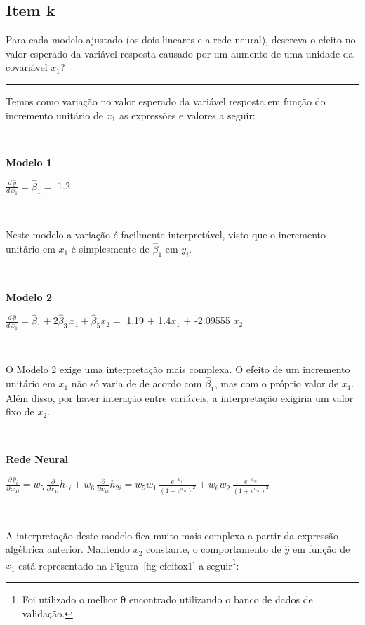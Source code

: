 \documentclass[
  a4paperpaper,
]{article}
\begin{document}
\subsection{Item k}\label{item-k}

Para cada modelo ajustado (os dois lineares e a rede neural), descreva o
efeito no valor esperado da variável resposta causado por um aumento de
uma unidade da covariável \(x_1\)?

\begin{center}\rule{0.5\linewidth}{0.5pt}\end{center}

Temos como variação no valor esperado da variável resposta em função do
incremento unitário de \(x_1\) as expressões e valores a seguir:

~

\textbf{Modelo 1}

\(\frac{d \, \hat{y}}{d \, x_1} = \hat{\beta}_1 =\) 1.2

~

Neste modelo a variação é facilmente interpretável, visto que o
incremento unitário em \(x_1\) é simplesmente de \(\hat{\beta}_1\) em
\(y_i\).

~

\textbf{Modelo 2}

\(\frac{d \, \hat{y}}{d \, x_1} = \hat{\beta}_1 + 2\hat{\beta}_3 \, x_1 + \hat{\beta}_5 x_2 =\)
1.19 + 1.4\(x_1\) + -2.09555 \(x_2\)

~

O Modelo 2 exige uma interpretação mais complexa. O efeito de um
incremento unitário em \(x_1\) não só varia de de acordo com
\(\hat{\beta}_1\), mas com o próprio valor de \(x_1\). Além disso, por
haver interação entre variáveis, a interpretação exigiria um valor fixo
de \(x_2\).

~

\textbf{Rede Neural}

\(\frac{\partial \, \hat{y}_i}{\partial \, x_{1i}} = w_5 \, \frac{\partial}{\partial x_{1i}} h_{1i} + w_6\, \frac{\partial}{\partial x_{1i}} h_{2i} = w_5w_1 \, \frac{e^{-a_{1i}}}{(1+e^{a_{1i}})^2} + w_6w_2 \, \frac{e^{-a_{2i}}}{(1+e^{a_{2i}})^2}\)

~

A interpretação deste modelo fica muito mais complexa a partir da
expressão algébrica anterior. Mantendo \(x_2\) constante, o
comportamento de \(\hat{y}\) em função de \(x_1\) está representado na
Figura~\ref{fig-efeitox1} a seguir\footnote{Foi utilizado o melhor
  \(\boldsymbol{\theta}\) encontrado utilizando o banco de dados de
  validação.}:
\end{document}
